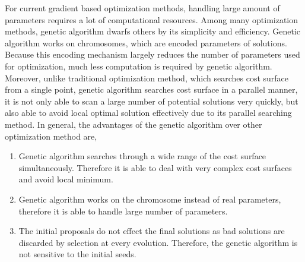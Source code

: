 For current gradient based optimization methods, handling large amount of parameters requires a lot of computational resources. Among many optimization methods, genetic algorithm dwarfs others by its simplicity and efficiency. Genetic algorithm works on chromosomes, which are encoded parameters of solutions. Because this encoding mechanism largely reduces the number of parameters used for optimization, much less computation is required by genetic algorithm. Moreover, unlike traditional optimization method, which searches cost surface from a single point, genetic algorithm searches cost surface in a parallel manner, it is not only able to scan a large number of potential solutions very quickly, but also able to avoid local optimal solution effectively due to its parallel searching method. In general, the advantages of the genetic algorithm over other optimization method are,

\begin{enumerate}
	\item Genetic algorithm searches through a wide range of the cost surface simultaneously. Therefore it is able to deal with very complex cost surfaces and avoid local minimum.
	\item Genetic algorithm works on the chromosome instead of real parameters, therefore it is able to handle large number of parameters.
	\item The initial proposals do not effect the final solutions as bad solutions are discarded by selection at every evolution. Therefore, the genetic algorithm is not sensitive to the initial seeds. 
\end{enumerate}

